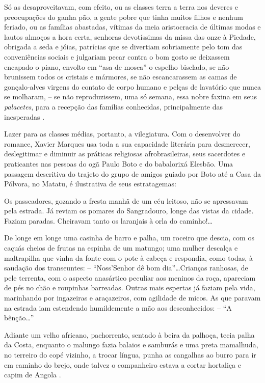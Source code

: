 \begin{citacao}
Só as desaproveitavam, com efeito, ou as classes terra a terra nos deveres e preocupações do ganha pão, a gente pobre que tinha muitos filhos e nenhum feriado, ou as famílias abastadas, vítimas da meia aristocracia de últimas modas e lautos almoços a hora certa, senhoras devotíssimas da missa das onze à Piedade, obrigada a seda e jóias, patrícias que se divertiam sobriamente pelo tom das conveniências sociais e julgariam pecar contra o bom gosto se deixassem encapado o piano, envolto em ``asa de mosca'' o espelho biselado, se não brunissem todos os cristais e mármores, se não escancarassem as camas de gonçalo-alves virgens do contato de corpo humano e pelças de lavatório que nunca se molharam, -- se não reproduzissem, uma só semana, essa nobre faxina em seus \textit{palacetes}, para a recepção das famílias conhecidas, principalmente das inesperadas \cite[pp.~4-5]{marques_feiticeiro_1975}.
\end{citacao}

Lazer para as classes médias, portanto, a vilegiatura. Com o desenvolver do romance, Xavier Marques usa toda a sua capacidade literária para desmerecer, deslegitimar e diminuir as práticas religiosas afrobrasileiras, seus sacerdotes e praticantes nas pessoas do ogã Paulo Boto e do babalorixá Elesbão. Uma passagem descritiva do trajeto do grupo de amigos guiado por Boto até a Casa da Pólvora, no Matatu, é ilustrativa de seus estratagemas:

\begin{citacao}
Os passeadores, gozando a fresta manhã de um céu leitoso, não se apressavam pela estrada. Já reviam os pomares do Sangradouro, longe das vistas da cidade. Faziam paradas. Cheiravam tanto os laranjais à orla do caminho!\dots

De longe em longe uma casinha de barro e palha, um roceiro que descia, com os caçuás cheios de frutas na espinha de um matungo; uma mulher descalça e maltrapilha que vinha da fonte com o pote à cabeça e respondia, como todas, à saudação dos transeuntes: -- ``Noss'Senhor dê bom dia''\dots Crianças ranhosas, de pele terrenta, com o aspecto anasártico peculiar aos meninos da roça, apareciam de pés no chão e roupinhas barreadas. Outras mais espertas já faziam pela vida, marinhando por ingazeiras e araçazeiros, com agilidade de micos. As que paravam na estrada iam estendendo humildemente a mão aos desconhecidos: -- ``A bênção\dots''

Adiante um velho africano, pachorrento, sentado à beira da palhoça, tecia palha da Costa, enquanto o malungo fazia balaios e samburás e uma preta mamalhuda, no terreiro do copé vizinho, a trocar língua, punha as cangalhas ao burro para ir em caminho do brejo, onde talvez o companheiro estava a cortar hortaliça e capim de Angola \cite[pp.~4-5]{marques_feiticeiro_1975}.
\end{citacao}

